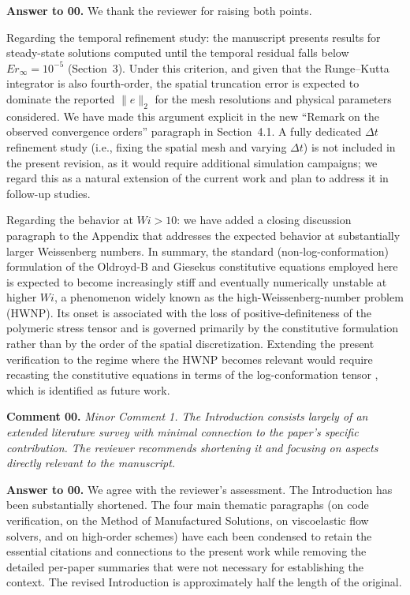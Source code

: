 \documentclass[12pt]{article}
\newcounter{question}
\newcommand{\name}{00}
\newcommand{\question}[1]{\stepcounter{question} \noindent \textbf{Comment \name.\thequestion} \emph{#1} }
\newcommand{\answer}[1]{\noindent \textbf{Answer to \name.\thequestion} #1 \mbox{}\\}
\begin{document}
\answer{We thank the reviewer for raising both points.

Regarding the temporal refinement study: the manuscript presents results for steady-state solutions computed until the temporal residual falls below $Er_\infty = 10^{-5}$ (Section~3). Under this criterion, and given that the Runge--Kutta integrator is also fourth-order, the spatial truncation error is expected to dominate the reported $\|e\|_2$ for the mesh resolutions and physical parameters considered. We have made this argument explicit in the new ``Remark on the observed convergence orders'' paragraph in Section~4.1. A fully dedicated $\Delta t$ refinement study (i.e., fixing the spatial mesh and varying $\Delta t$) is not included in the present revision, as it would require additional simulation campaigns; we regard this as a natural extension of the current work and plan to address it in follow-up studies.

Regarding the behavior at $Wi > 10$: we have added a closing discussion paragraph to the Appendix that addresses the expected behavior at substantially larger Weissenberg numbers. In summary, the standard (non-log-conformation) formulation of the Oldroyd-B and Giesekus constitutive equations employed here is expected to become increasingly stiff and eventually numerically unstable at higher $Wi$, a phenomenon widely known as the high-Weissenberg-number problem (HWNP). Its onset is associated with the loss of positive-definiteness of the polymeric stress tensor and is governed primarily by the constitutive formulation rather than by the order of the spatial discretization. Extending the present verification to the regime where the HWNP becomes relevant would require recasting the constitutive equations in terms of the log-conformation tensor \citep{Fernandes2022}, which is identified as future work.}

\vspace{3mm}

\question{Minor Comment 1. The Introduction consists largely of an extended literature survey with minimal connection to the paper's specific contribution. The reviewer recommends shortening it and focusing on aspects directly relevant to the manuscript.}

\answer{We agree with the reviewer's assessment. The Introduction has been substantially shortened. The four main thematic paragraphs (on code verification, on the Method of Manufactured Solutions, on viscoelastic flow solvers, and on high-order schemes) have each been condensed to retain the essential citations and connections to the present work while removing the detailed per-paper summaries that were not necessary for establishing the context. The revised Introduction is approximately half the length of the original.}
\end{document}
